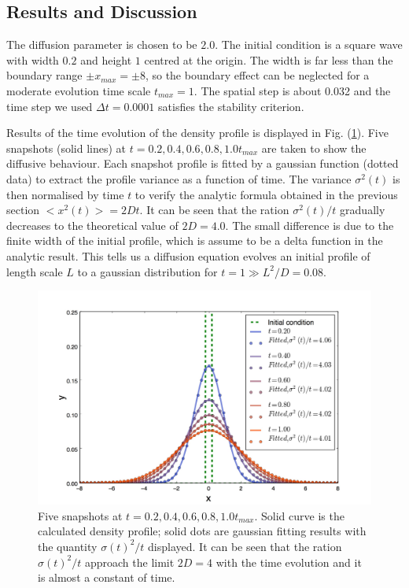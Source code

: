 \documentclass[a4paper,12pt]{article}
\begin{document}
\subsection{Results and Discussion}
The diffusion parameter is chosen to be $2.0$. The initial condition is a square wave with width $0.2$ and height $1$ centred at the origin. The width is far less than the boundary range $\pm x_{max} = \pm 8$, so the boundary effect can be neglected for a moderate evolution time scale $t_{max} = 1$. The spatial step is about 0.032 and the time step we used $\Delta t = 0.0001$ satisfies the stability criterion.

Results of the time evolution of the density profile is displayed in Fig. (\ref{diffusion_pic_snapshots}). Five snapshots (solid lines) at $t = 0.2, 0.4, 0.6, 0.8, 1.0 t_{max}$ are taken to show the diffusive behaviour. Each snapshot profile is fitted by a gaussian function (dotted data) to extract the profile variance as a function of time. The variance $\sigma^2(t)$ is then normalised by time $t$ to verify the analytic formula obtained in the previous section $<x^2(t)> = 2Dt$. It can be seen that the ration $\sigma^2(t)/t$ gradually decreases to the theoretical value of $2D = 4.0$. The small difference is due to the finite width of the initial profile, which is assume to be a delta function in the analytic result. This tells us a diffusion equation evolves an initial profile of length scale $L$ to a gaussian distribution for $t = 1 \gg L^2/D = 0.08$.
\begin{figure}[htbp]
\begin{center}
\includegraphics[width = \textwidth]{pics/diffusion_snapshot.jpeg}
\caption{Five snapshots at $t = 0.2, 0.4, 0.6, 0.8, 1.0 t_{max}$. Solid curve is the calculated density profile; solid dots are gaussian fitting results with the quantity $\sigma(t)^2/t$ displayed. It can be seen that the ration $\sigma(t)^2/t$ approach the limit $2D = 4$ with the time evolution and it is almost a constant of time.}
\label{diffusion_pic_snapshots}
\end{center}
\end{figure}
\end{document}
